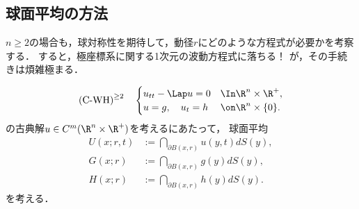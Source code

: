 \documentclass[uplatex,dvipdfmx]{jsreport}
\begin{document}
\subsection{球面平均の方法}

\begin{tcolorbox}[colframe=ForestGreen, colback=ForestGreen!10!white,breakable,colbacktitle=ForestGreen!40!white,coltitle=black,fonttitle=\bfseries\sffamily,
title=]
    $n\ge2$の場合も，球対称性を期待して，動径$r$にどのような方程式が必要かを考察する．
    すると，極座標系に関する1次元の波動方程式に落ちる！
    が，その手続きは煩雑極まる．
\end{tcolorbox}

\begin{problem}
    \[\text{(C-WH)}^{\ge2}\quad\begin{cases}
        u_{tt}-\Lap u=0&\In\R^n\times\R^+,\\
        u=g,\quad u_t=h&\on\R^n\times\{0\}.
    \end{cases}\]
    の古典解$u\in C^m(\R^n\times\R^+)$を考えるにあたって，
    球面平均
    \begin{align*}
        U(x;r,t)&:=\dint_{\partial B(x,r)}u(y,t)dS(y),\\
        G(x;r)&:=\dint_{\partial B(x,r)}g(y)dS(y),\\
        H(x;r)&:=\dint_{\partial B(x,r)}h(y)dS(y).
    \end{align*}
    を考える．
\end{problem}
\end{document}

